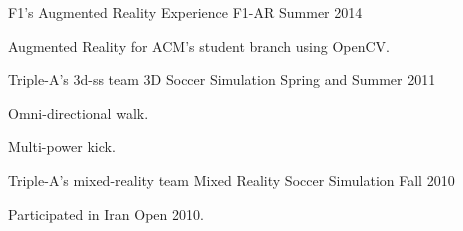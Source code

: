 \begin{cventries}
  \cventry
    {F1’s Augmented Reality Experience} %
    {F1-AR} %
    {} %
    {Summer 2014} %
    {
      \begin{cvitems} %
        \item {Augmented Reality for ACM's student branch using OpenCV.}
      \end{cvitems}
    }
    
  \cventry
    {Triple-A's 3d-ss team} %
    {3D Soccer Simulation} %
    {} %
    {Spring and Summer 2011} %
    {
      \begin{cvitems} %
        \item {Omni-directional walk.}
        \item {Multi-power kick.}
      \end{cvitems}
    }
    
    \cventry
    {Triple-A's mixed-reality team} %
    {Mixed Reality Soccer Simulation} %
    {} %
    {Fall 2010} %
    {
      \begin{cvitems} %
        \item {Participated in Iran Open 2010.}
      \end{cvitems}
    }

\end{cventries}
